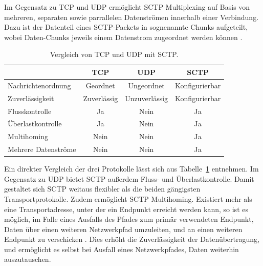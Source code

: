 \vspace{11pt}

Im Gegensatz zu \acs{TCP} und \acs{UDP} ermöglicht \acs{SCTP} Multiplexing auf Basis von mehreren, separaten sowie parrallelen Datenströmen innerhalb einer Verbindung. Dazu ist der Datenteil eines \acs{SCTP}-Packets in sognenannte \glqq{}Chunks\grqq{}  aufgeteilt, wobei Daten-Chunks jeweils einem Datenstrom zugeordnet werden können \cite{sctpRFC}.\par

\begin{table}[ht]
\centering
\begin{tabular}[t]{lccc}
\toprule
&TCP&UDP&SCTP\\
\midrule
Nachrichtenordnung&Geordnet&Ungeordnet&Konfigurierbar\\
Zuverlässigkeit&Zuverlässig&Unzuverlässig&Konfigurierbar\\
Flusskontrolle&Ja&Nein&Ja\\
Überlastkontrolle &Ja&Nein&Ja\\
Multihoming&Nein&Nein&Ja\\
Mehrere Datenströme&Nein&Nein&Ja\\
\bottomrule
\end{tabular}
\caption{Vergleich von \acs{TCP} und \acs{UDP} mit \acs{SCTP}.}
\label{table:vergleichNetzwerkProtokolle}
\end{table}

Ein direkter Vergleich der drei Protokolle lässt sich aus Tabelle~\ref{table:vergleichNetzwerkProtokolle} entnehmen. Im Gegensatz zu \acs{UDP} bietet \acs{SCTP} außerdem Fluss- und Überlastkontrolle. Damit gestaltet sich \acs{SCTP} weitaus flexibler als die beiden gängigsten Transportprotokolle. Zudem ermöglicht \acs{SCTP} Multihoming. Existiert mehr als eine Transportadresse, unter der ein Endpunkt erreicht werden kann, so ist es möglich, im Falle eines Ausfalls des Pfades zum primär verwendeten Endpunkt, Daten über einen weiteren Netzwerkpfad umzuleiten, und an einen weiteren Endpunkt zu verschicken \cite{sctpRFC, multihoming}. Dies erhöht die Zuverlässigkeit der Datenübertragung, und ermöglicht es selbst bei Ausfall eines Netzwerkpfades, Daten weiterhin auszutauschen.\par


